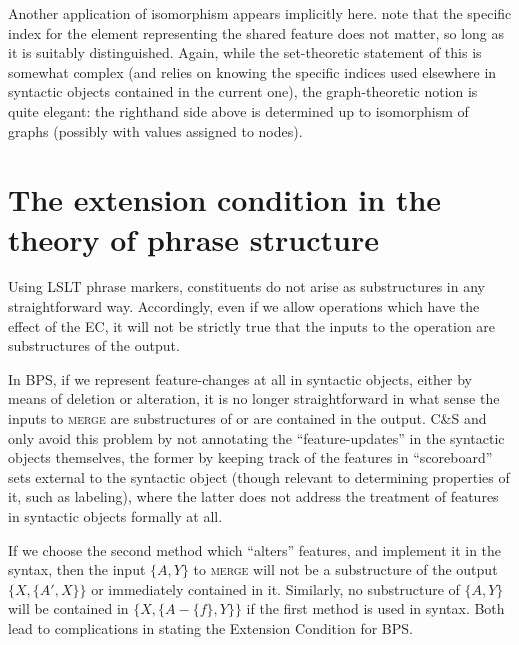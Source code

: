\documentclass[output=paper]{langsci/langscibook}
\begin{document}
Another application of isomorphism appears implicitly here.
\citeauthor{frampton2000agreement} note that the specific index for the element
representing the shared feature does not matter, so long as it is suitably
distinguished. Again, while the set-theoretic statement of this is somewhat
complex (and relies on knowing the specific indices used elsewhere in syntactic
objects contained in the current one), the graph-theoretic notion is quite
elegant: the righthand side above is determined up to isomorphism of graphs
(possibly with values assigned to nodes).

\section{The extension condition in the theory of phrase structure}

Using LSLT\nocite{Chomsky1955} phrase markers, constituents
do not arise as substructures in any straightforward way. Accordingly, even if
we allow operations which have the effect of the \gls{EC}, it will not be strictly true that the inputs to the operation are
substructures of the output.

In \gls{BPS}, if we represent feature-changes at all
in syntactic objects, either by means of deletion or alteration, it is no
longer straightforward in what sense the inputs to \textsc{merge} are
substructures of or are contained in the output.  C\&S\nocite{ColSta2016} and
\cite{Chomsky2000} only avoid this problem by not annotating the
\enquote{feature-updates} in the syntactic objects themselves, the former by
keeping track of the features in \enquote{scoreboard} sets external to the
syntactic object (though relevant to determining properties of it, such as
labeling), where the latter does not address the treatment of features in
syntactic objects formally at all.

If we choose the second method which \enquote{alters} features, and implement it in
the syntax, then the input $\{A,Y\}$ to \textsc{merge} will not be a
substructure of the output $\{X,\{A',X\}\}$ or immediately contained in it.
Similarly, no substructure of $\{A,Y\}$ will be contained in
$\{X,\{A-\{f\},Y\}\}$ if the first method is used in syntax. Both lead to
complications in stating the Extension Condition for \gls{BPS}.
\end{document}
